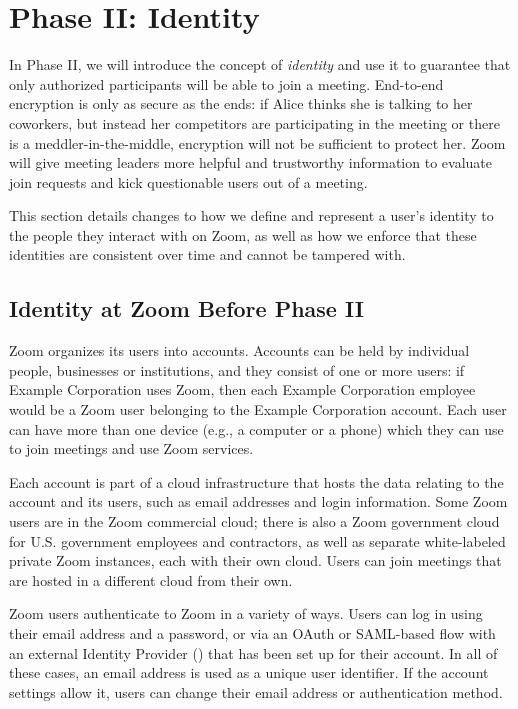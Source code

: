 \section{Phase II: Identity}

In Phase II, we will introduce the concept of \textit{identity} and use it to guarantee that only
authorized participants will be able to join a meeting. End-to-end encryption is only as secure as
the ends: if Alice thinks she is talking to her coworkers, but instead her competitors are
participating in the meeting or there is a meddler-in-the-middle, encryption will not be sufficient to protect her. Zoom will give
meeting leaders more helpful and trustworthy information to evaluate join requests and kick
questionable users out of a meeting.

This section details changes to how we define and represent a user's identity to the people they
interact with on Zoom, as well as how we enforce that these identities are consistent over time and
cannot be tampered with.

\subsection{Identity at Zoom Before Phase II}

Zoom organizes its users into accounts. Accounts can be held by individual people, businesses or
institutions, and they consist of one or more users: if Example Corporation uses Zoom, then each
Example Corporation employee would be a Zoom user belonging to the Example Corporation account. Each
user can have more than one device (e.g., a computer or a phone) which they can use to join meetings
and use Zoom services.

Each account is part of a cloud infrastructure that hosts the data relating to the account and its
users, such as email addresses and login information. Some Zoom users are in the Zoom commercial
cloud; there is also a Zoom government cloud for U.S. government employees and contractors, as well
as separate white-labeled private Zoom instances, each with their own cloud. Users can join meetings
that are hosted in a different cloud from their own.

Zoom users authenticate to Zoom in a variety of ways. Users can log in using their email address and
a password, or via an OAuth or SAML-based flow with an external Identity Provider (\idp) that has
been set up for their account. In all of these cases, an email address is
used as a unique user identifier. If the account settings allow it, users can change their email
address or authentication method.

